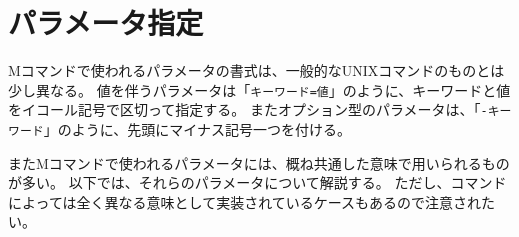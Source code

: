 
%

\section{パラメータ指定}
Mコマンドで使われるパラメータの書式は、一般的なUNIXコマンドのものとは少し異なる。
値を伴うパラメータは「\verb|キーワード=値|」のように、キーワードと値をイコール記号で区切って指定する。
またオプション型のパラメータは、「\verb|-キーワード|」のように、先頭にマイナス記号一つを付ける。

またMコマンドで使われるパラメータには、概ね共通した意味で用いられるものが多い。
以下では、それらのパラメータについて解説する。
ただし、コマンドによっては全く異なる意味として実装されているケースもあるので注意されたい。

